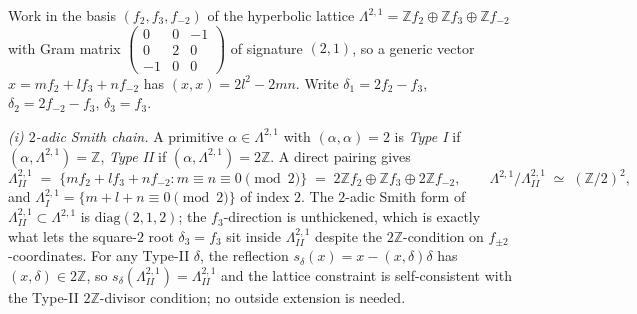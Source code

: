 \begin{lemma}
\label{lem:type-II-2adic-S3-igusa-sign}
Work in the basis $(f_2, f_3, f_{-2})$ of the hyperbolic lattice
$\Lambda^{2,1} = \mathbb{Z}f_2 \oplus \mathbb{Z}f_3 \oplus
\mathbb{Z}f_{-2}$ with Gram matrix
$\left(\begin{smallmatrix} 0 & 0 & -1 \\ 0 & 2 & 0 \\ -1 & 0 & 0
\end{smallmatrix}\right)$ of signature $(2,1)$, so a generic vector
$x = m f_2 + l f_3 + n f_{-2}$ has $(x, x) = 2l^2 - 2mn$. Write
$\delta_1 = 2f_2 - f_3$, $\delta_2 = 2f_{-2} - f_3$,
$\delta_3 = f_3$.

\emph{(i) $2$-adic Smith chain.} A primitive $\alpha \in
\Lambda^{2,1}$ with $(\alpha,\alpha) = 2$ is \emph{Type I} if
$(\alpha,\Lambda^{2,1}) = \mathbb{Z}$, \emph{Type II} if
$(\alpha,\Lambda^{2,1}) = 2\mathbb{Z}$. A direct pairing gives
\[
\Lambda^{2,1}_{II}
\;=\; \{m f_2 + l f_3 + n f_{-2} : m \equiv n \equiv 0 \pmod 2\}
\;=\; 2\mathbb{Z}f_2 \oplus \mathbb{Z}f_3 \oplus 2\mathbb{Z}f_{-2},
\qquad
\Lambda^{2,1} / \Lambda^{2,1}_{II} \;\simeq\; (\mathbb{Z}/2)^2,
\]
and $\Lambda^{2,1}_I = \{m + l + n \equiv 0 \pmod 2\}$ of index
$2$. The $2$-adic Smith form of
$\Lambda^{2,1}_{II} \subset \Lambda^{2,1}$ is
$\mathrm{diag}(2, 1, 2)$; the $f_3$-direction is unthickened, which
is exactly what lets the square-$2$ root $\delta_3 = f_3$ sit
inside $\Lambda^{2,1}_{II}$ despite the $2\mathbb{Z}$-condition on
$f_{\pm 2}$-coordinates. For any Type-II $\delta$, the reflection
$s_\delta(x) = x - (x,\delta)\delta$ has $(x,\delta) \in
2\mathbb{Z}$, so $s_\delta(\Lambda^{2,1}_{II}) = \Lambda^{2,1}_{II}$
and the lattice constraint is self-consistent with the Type-II
$2\mathbb{Z}$-divisor condition; no outside extension is needed.


\end{lemma}
